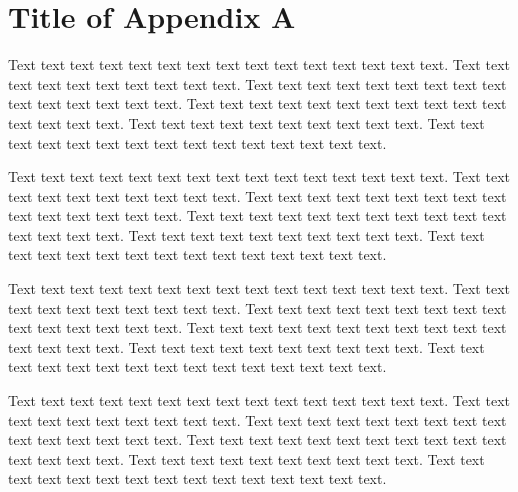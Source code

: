 \chapter{Title of Appendix A}

Text text text text text text text text text text text text text text text. Text text text text text text text text text text. Text text text text text text text text text text text text text text text. Text text text text text text text text text text text text text text text. Text text text text text text text text text text. Text text text text text text text text text text text text text text text. 

Text text text text text text text text text text text text text text text. Text text text text text text text text text text. Text text text text text text text text text text text text text text text. Text text text text text text text text text text text text text text text. Text text text text text text text text text text. Text text text text text text text text text text text text text text text. 

Text text text text text text text text text text text text text text text. Text text text text text text text text text text. Text text text text text text text text text text text text text text text. Text text text text text text text text text text text text text text text. Text text text text text text text text text text. Text text text text text text text text text text text text text text text. 

Text text text text text text text text text text text text text text text. Text text text text text text text text text text. Text text text text text text text text text text text text text text text. Text text text text text text text text text text text text text text text. Text text text text text text text text text text. Text text text text text text text text text text text text text text text. 


